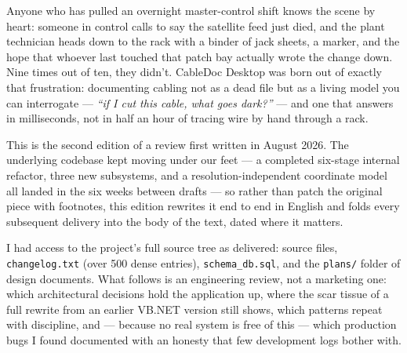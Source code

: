 \documentclass[10.4pt,twocolumn]{article}
\newcommand{\dropcap}[1]{\lettrine[lines=3,lraise=0.05,nindent=0pt,slope=0pt,findent=2pt]{\headfont\color{BDaccent}#1}{}}
\begin{document}

\thispagestyle{fancy}

\dropcap{A}nyone who has pulled an overnight master-control shift knows the scene by heart: someone in control calls to say the satellite feed just died, and the plant technician heads down to the rack with a binder of jack sheets, a marker, and the hope that whoever last touched that patch bay actually wrote the change down. Nine times out of ten, they didn't. CableDoc Desktop was born out of exactly that frustration: documenting cabling not as a dead file but as a living model you can interrogate --- \emph{``if I cut this cable, what goes dark?''} --- and one that answers in milliseconds, not in half an hour of tracing wire by hand through a rack.

This is the second edition of a review first written in August 2026. The underlying codebase kept moving under our feet --- a completed six-stage internal refactor, three new subsystems, and a resolution-independent coordinate model all landed in the six weeks between drafts --- so rather than patch the original piece with footnotes, this edition rewrites it end to end in English and folds every subsequent delivery into the body of the text, dated where it matters.

I had access to the project's full source tree as delivered: source files, \texttt{changelog.txt} (over 500 dense entries), \texttt{schema\_db.sql}, and the \texttt{plans/} folder of design documents. What follows is an engineering review, not a marketing one: which architectural decisions hold the application up, where the scar tissue of a full rewrite from an earlier VB.NET version still shows, which patterns repeat with discipline, and --- because no real system is free of this --- which production bugs I found documented with an honesty that few development logs bother with.
\end{document}
